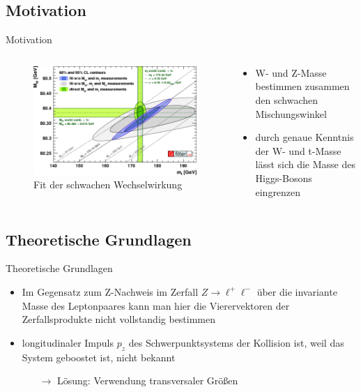 \documentclass[aspectratio=1610, 9pt]{beamer}
\begin{document}
\subsection{Motivation}
\begin{frame}{Motivation}
  \begin{columns}
    \begin{column}{0.5\textwidth}
      \begin{figure}
        \includegraphics[width=\textwidth]{images/gfitter.png}
        \caption{Fit der schwachen Wechselwirkung \cite{gfitter}}
        \label{fig:gfitter}
      \end{figure}
    \end{column}
    \begin{column}{0.4\textwidth}
      \begin{itemize}
        \item W- und Z-Masse bestimmen zusammen den schwachen Mischungswinkel
        \item durch genaue Kenntnis der W- und t-Masse lässt sich die Masse des Higgs-Bosons eingrenzen
      \end{itemize}
    \end{column}
  \end{columns}
\end{frame}

\subsection{Theoretische Grundlagen}
\begin{frame}{Theoretische Grundlagen}
   \begin{itemize}
     \item Im Gegensatz zum Z-Nachweis im Zerfall $Z \rightarrow \ell^+ \ell^-$ über die invariante Masse des Leptonpaares kann man hier die Vierervektoren der Zerfallsprodukte nicht vollstandig bestimmen
     \item longitudinaler Impuls $p_z$ des Schwerpunktsystems der Kollision ist, weil das System geboostet ist, nicht bekannt
     \begin{itemize}
       \item[$\rightarrow$] Lösung: Verwendung transversaler Größen
     \end{itemize}
   \end{itemize}
\end{frame}
\end{document}
